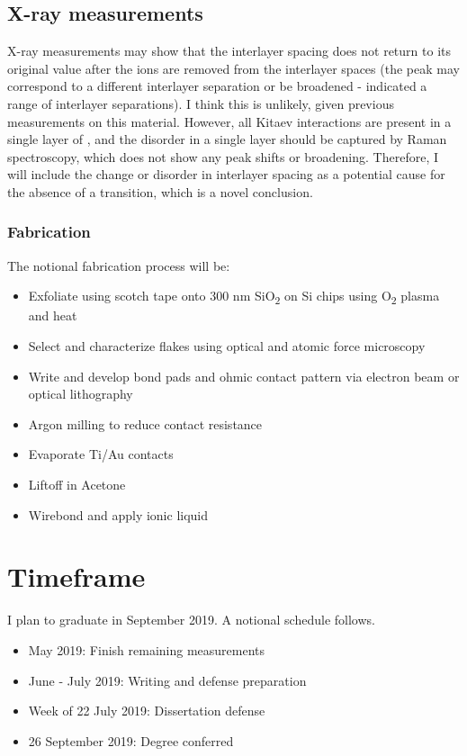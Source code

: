 \documentclass[11pt]{article}
\begin{document}
\subsection{X-ray measurements}

X-ray measurements may show that the interlayer spacing does not return to its original value after the ions are removed from the interlayer spaces (the peak may correspond to a different interlayer separation or be broadened - indicated a range of interlayer separations). I think this is unlikely, given previous measurements on this material. However, all Kitaev interactions are present in a single layer of \ruclnospace , and the disorder in a single layer should be captured by Raman spectroscopy, which does not show any peak shifts or broadening. Therefore, I will include the change or disorder in interlayer spacing as a potential cause for the absence of a transition, which is a novel conclusion. 

\subsubsection{Fabrication}

The notional fabrication process will be:

\begin{itemize}
	\item Exfoliate \rucl using scotch tape onto 300 nm SiO\textsubscript{2} on Si chips using O\textsubscript{2} plasma and heat
	\item Select and characterize flakes using optical and atomic force microscopy
	\item Write and develop bond pads and ohmic contact pattern via electron beam or optical lithography
	\item Argon milling to reduce contact resistance
	\item Evaporate Ti/Au contacts
	\item Liftoff in Acetone
	\item Wirebond and apply ionic liquid
\end{itemize}

\section{Timeframe}
I plan to graduate in September 2019. A notional schedule follows.

\begin{itemize}
	\item May 2019: Finish remaining measurements
	\item June - July 2019: Writing and defense preparation
	\item Week of 22 July 2019: Dissertation defense
	\item 26 September 2019: Degree conferred	
\end{itemize}



\end{document}

